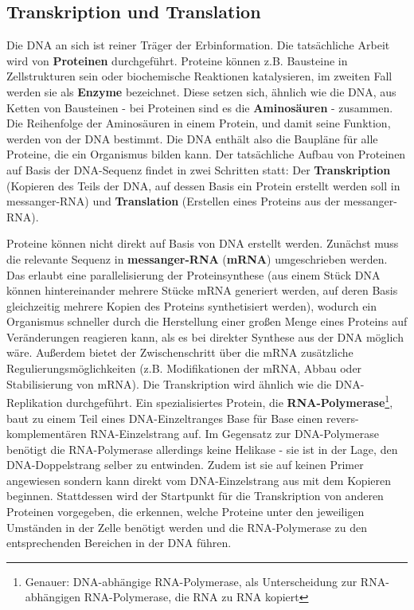 \subsection{Transkription und Translation}
Die DNA an sich ist reiner Träger der Erbinformation. Die tatsächliche Arbeit wird von \textbf{Proteinen} durchgeführt. Proteine können z.B. Bausteine in Zellstrukturen sein oder biochemische Reaktionen katalysieren, im zweiten Fall werden sie als \textbf{Enzyme} bezeichnet. Diese setzen sich, ähnlich wie die DNA, aus Ketten von Bausteinen - bei Proteinen sind es die \textbf{Aminosäuren} - zusammen. Die Reihenfolge der Aminosäuren in einem Protein, und damit seine Funktion, werden von der DNA bestimmt. Die DNA enthält also die Baupläne für alle Proteine, die ein Organismus bilden kann. Der tatsächliche Aufbau von Proteinen auf Basis der DNA-Sequenz findet in zwei Schritten statt: Der \textbf{Transkription} (Kopieren des Teils der DNA, auf dessen Basis ein Protein erstellt werden soll in messanger-RNA) und \textbf{Translation} (Erstellen eines Proteins aus der messanger-RNA).

Proteine können nicht direkt auf Basis von DNA erstellt werden. Zunächst muss die relevante Sequenz in \textbf{messanger-RNA} (\textbf{mRNA}) umgeschrieben werden. Das erlaubt eine parallelisierung der Proteinsynthese (aus einem Stück DNA können hintereinander mehrere Stücke mRNA generiert werden, auf deren Basis gleichzeitig mehrere Kopien des Proteins synthetisiert werden), wodurch ein Organismus schneller durch die Herstellung einer großen Menge eines Proteins auf Veränderungen reagieren kann, als es bei direkter Synthese aus der DNA möglich wäre. Außerdem bietet der Zwischenschritt über die mRNA zusätzliche Regulierungsmöglichkeiten (z.B. Modifikationen der mRNA, Abbau oder Stabilisierung von mRNA). Die Transkription wird ähnlich wie die DNA-Replikation durchgeführt. Ein spezialisiertes Protein, die \textbf{RNA-Polymerase}\footnote{Genauer: DNA-abhängige RNA-Polymerase, als Unterscheidung zur RNA-abhängigen RNA-Polymerase, die RNA zu RNA kopiert}, baut zu einem Teil eines DNA-Einzeltranges Base für Base einen revers-komplementären RNA-Einzelstrang auf. Im Gegensatz zur DNA-Polymerase benötigt die RNA-Polymerase allerdings keine Helikase - sie ist in der Lage, den DNA-Doppelstrang selber zu entwinden. Zudem ist sie auf keinen Primer angewiesen sondern kann direkt vom DNA-Einzelstrang aus mit dem Kopieren beginnen. Stattdessen wird der Startpunkt für die Transkription von anderen Proteinen vorgegeben, die erkennen, welche Proteine unter den jeweiligen Umständen in der Zelle benötigt werden und die RNA-Polymerase zu den entsprechenden Bereichen in der DNA führen. 

